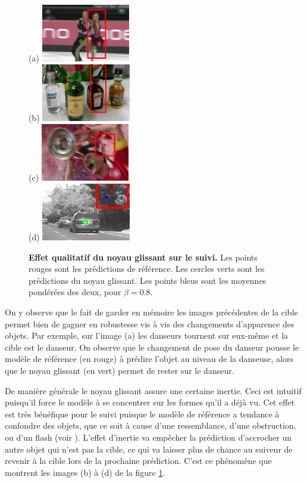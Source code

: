 \documentclass[10pt,twocolumn,letterpaper,french]{article}
\begin{document}
\begin{figure}[!h]
  \centering
  (a)
  \includegraphics[width=110pt]{images/gamma/000469.png}\\
  (b)
  \includegraphics[width=110pt]{images/gamma/000726.png}\\
  (c)
  \includegraphics[width=110pt]{images/gamma/000038.png}\\
  (d)
  \includegraphics[width=110pt]{images/gamma/000414.png}\\
  \caption{\textbf{Effet qualitatif du noyau glissant sur le suivi.} Les points rouges sont les prédictions de référence. Les cercles verts sont les prédictions du noyau glissant. Les points bleus sont les moyennes pondérées des deux, pour $\beta=0.8$.}
  \label{exemples_predictions}
  \end{figure}

On y observe que le fait de garder en mémoire les images précédentes de la cible permet bien de gagner en robustesse vis à vis des changements d'apparence des objets. Par exemple, sur l'image (a) les danseurs tournent sur eux-même et la cible est le danseur. On observe que le changement de pose du danseur pousse le modèle de référence (en rouge) à prédire l'objet au niveau de la danseuse, alors que le noyau glissant (en vert) permet de rester sur le danseur.

De manière générale le noyau glissant assure une certaine inertie. Ceci est intuitif puisqu'il force le modèle à se concentrer sur les formes qu'il a déjà vu. Cet effet est très bénéfique pour le suivi puisque le modèle de référence a tendance à confondre des objets, que ce soit à cause d'une ressemblance, d'une obstruction, ou d'un flash (voir \textit{}). L'effet d'inertie va empêcher la prédiction d'accrocher un autre objet qui n'est pas la cible, ce qui va laisser plus de chance au suiveur de revenir à la cible lors de la prochaine prédiction. C'est ce phénomène que montrent les images (b) à (d) de la figure  \ref{exemples_predictions}.
\end{document}
